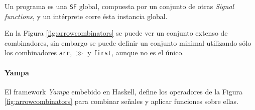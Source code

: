   Un programa es una \texttt{SF} global, compuesta por un conjunto
de otras \textit{Signal functions}, y un intérprete corre ésta instancia
global.

  En la Figura \ref{fig:arrowcombinators} se puede ver un conjunto
extenso de combinadores, sin embargo se
puede definir un conjunto minimal utilizando sólo
los combinadores \texttt{arr},
$\gg$ y \texttt{first}, aunque no es el único.

  \paragraph{Yampa}
  El framework \textit{Yampa} \cite{yampa} embebido en Haskell, 
define los operadores de la Figura \ref{fig:arrowcombinators}
para combinar señales y aplicar funciones sobre ellas.




